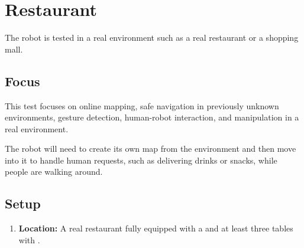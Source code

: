 \section{Restaurant}
The robot is tested in a real environment such as a real restaurant or a shopping mall.

\subsection{Focus}
This test focuses on online mapping, safe navigation in previously unknown environments, gesture detection, human-robot interaction, and manipulation in a real environment.

The robot will need to create its own map from the environment and then move into it to handle human requests, such as delivering drinks or snacks, while people are walking around.

\subsection{Setup}
\begin{enumerate}
	\item \textbf{Location:} A real restaurant fully equipped with a  and at least three tables with . 
\end{enumerate}

